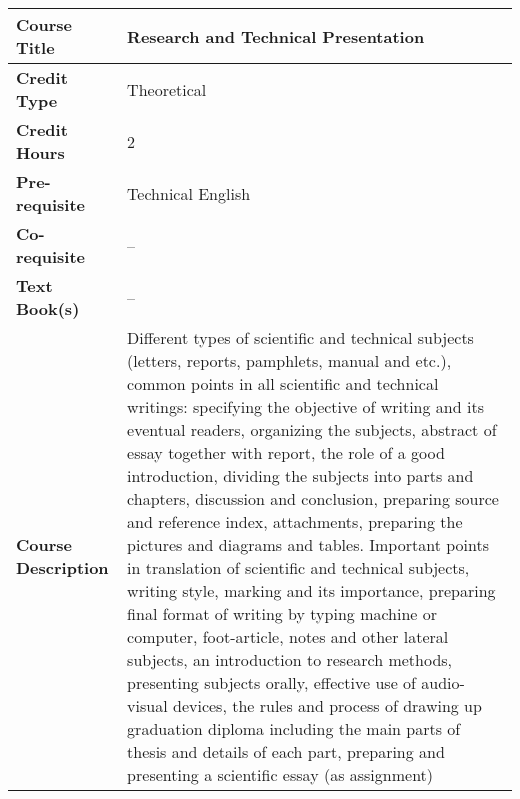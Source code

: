 \documentclass[11pt]{article}
\begin{document}
\begin{table}[h!]
\begin{tabular}{|l|l|}
\hline
\textbf{Course Title}       &  Research and Technical Presentation \\ \hline
\textbf{Credit Type}        &  Theoretical \\ \hline
\textbf{Credit Hours}       &  2 \\ \hline
\textbf{Pre-requisite}       &  Technical English \\ \hline
\textbf{Co-requisite}       &  -- \\ \hline
\textbf{Text Book(s)}       & -- \\ \hline
\textbf{Course Description} & \begin{minipage}{.70\textwidth}
\vspace{3mm}
Different types of scientific and technical subjects (letters, reports, pamphlets, manual and etc.), common points in all scientific and technical writings: specifying the objective of writing and its
eventual readers, organizing the subjects, abstract of essay together with report, the role of a good
introduction, dividing the subjects into parts and chapters, discussion and conclusion, preparing source
and reference index, attachments, preparing the pictures and diagrams and tables. Important points in
translation of scientific and technical subjects, writing style, marking and its importance, preparing final
format of writing by typing machine or computer, foot-article, notes and other lateral subjects, an
introduction to research methods, presenting subjects orally, effective use of audio-visual devices, the
rules and process of drawing up graduation diploma including the main parts of thesis and details of
each part, preparing and presenting a scientific essay (as assignment)
\vspace{3mm}
\end{minipage} \\ \hline
\end{tabular}
\end{table}
\end{document}
